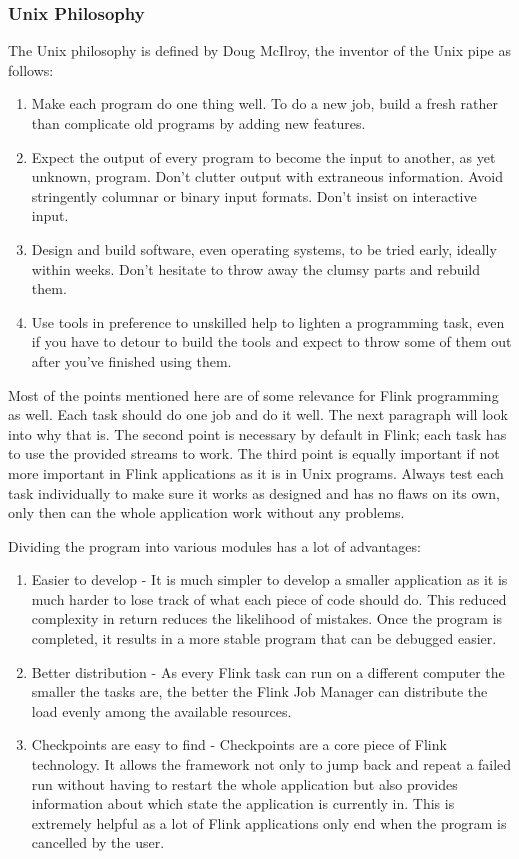 \subsubsection{Unix Philosophy}
The Unix philosophy is defined by Doug McIlroy, the inventor of the Unix pipe as follows: \cite{bell1978}
\begin{enumerate}
  \item Make each program do one thing well. To do a new job, build a fresh rather than complicate old programs by adding new features.
  \item Expect the output of every program to become the input to another, as yet unknown, program. Don't clutter output with extraneous information. Avoid stringently columnar or binary input formats. Don't insist on interactive input.
  \item Design and build software, even operating systems, to be tried early, ideally within weeks. Don't hesitate to throw away the clumsy parts and rebuild them.
  \item Use tools in preference to unskilled help to lighten a programming task, even if you have to detour to build the tools and expect to throw some of them out after you've finished using them.
\end{enumerate}

Most of the points mentioned here are of some relevance for Flink programming as well. Each task should do one job and do it well. The next paragraph will look into why that is. The second point is necessary by default in Flink; each task has to use the provided streams to work. The third point is equally important if not more important in Flink applications as it is in Unix programs. Always test each task individually to make sure it works as designed and has no flaws on its own, only then can the whole application work without any problems.

Dividing the program into various modules has a lot of advantages:
\begin{enumerate}
  \item Easier to develop - It is much simpler to develop a smaller application as it is much harder to lose track of what each piece of code should do. This reduced complexity in return reduces the likelihood of mistakes. Once the program is completed, it results in a more stable program that can be debugged easier.
  \item Better distribution -  As every Flink task can run on a different computer the smaller the tasks are, the better the Flink Job Manager can distribute the load evenly among the available resources.
  \item Checkpoints are easy to find - Checkpoints are a core piece of Flink technology. It allows the framework not only to jump back and repeat a failed run without having to restart the whole application but also provides information about which state the application is currently in. This is extremely helpful as a lot of Flink applications only end when the program is cancelled by the user.
\end{enumerate}

